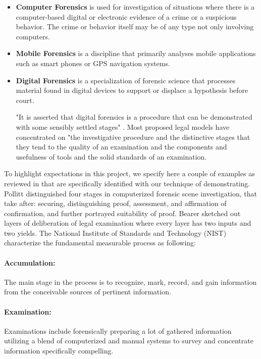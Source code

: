 \begin{itemize}
\item\textbf{Computer Forensics} is used for investigation of situations where there is a computer-based digital or electronic evidence of a crime or a suspicious behavior. The crime or behavior itself may be of any type not only involving computers.


\item\textbf{Mobile Forensics} is a discipline that primarily analyses mobile applications such as smart phones or GPS navigation systems. 


\item\textbf{Digital Forensics}  is a specialization of forensic science that processes material found in digital devices to support or displace a hypothesis before court.


"It is asserted that digital forensics is a procedure that can be demonstrated with some sensibly settled stages" \cite{4}. Most proposed legal models have concentrated on "the investigative procedure and the distinctive stages that they tend to the quality of an examination and the components and usefulness of tools and the solid standards of an examination.%
\end{itemize}


To highlight expectations in this project, we specify here a couple of examples as reviewed in \cite{3} that are specifically identified with our technique of demonstrating. Pollitt \cite{3} distinguished four stages in computerized forensic scene investigation, that take after: securing, distinguishing proof, assessment, and affirmation of confirmation, and further portrayed suitability of proof. Bearer \cite{1} sketched out layers of deliberation of legal examination where every layer has two inputs and two yields. The National Institute of Standards and Technology (NIST) \cite{3} characterize the fundamental measurable process as following:

\paragraph{Accumulation:} 
The main stage in the process is to recognize, mark, record, and gain information from the conceivable sources of pertinent information. 

\paragraph{Examination:}
Examinations include forensically preparing a lot of gathered information utilizing a blend of computerized and manual systems to survey and concentrate information specifically compelling. 

